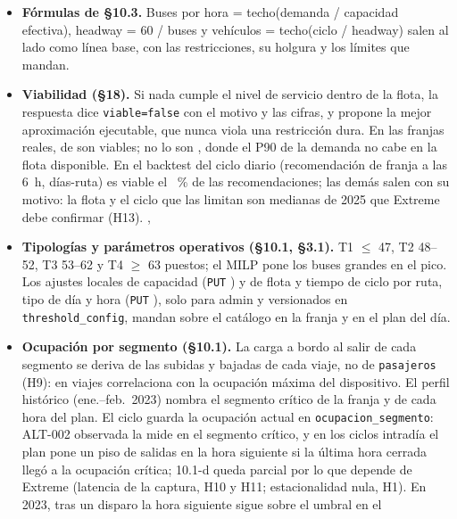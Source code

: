 \documentclass[10pt,a4paper]{article}
\begin{document}
\begin{itemize}
\item \textbf{Fórmulas de §10.3.} Buses por hora = techo(demanda / capacidad efectiva), headway = 60 / buses y
  vehículos = techo(ciclo / headway) salen al lado como línea base, con las restricciones, su holgura y los límites
  que mandan.
\item \textbf{Viabilidad (§18).} Si nada cumple el nivel de servicio dentro de la flota, la respuesta dice
  \texttt{viable=false} con el motivo y las cifras, y propone la mejor aproximación ejecutable, que nunca viola una
  restricción dura. En las franjas reales, \FranjasViables{} de \FranjasTotal{} son viables; no lo son
  \FranjasNoViables, donde el P90 de la demanda no cabe en la flota disponible. En el backtest del ciclo diario
  (recomendación de franja a las 6~h, \DiasRuta{} días-ruta) es viable el \ViablesBacktest~\% de las recomendaciones;
  las demás salen con su motivo: la flota y el ciclo que las limitan son medianas de 2025 que Extreme debe confirmar
  (H13).
  ,
\item \textbf{Tipologías y parámetros operativos (§10.1, §3.1).} T1 $\le$ 47, T2 48--52, T3 53--62 y T4 $\ge$ 63
  puestos; el MILP pone los buses grandes en el pico. Los ajustes locales de capacidad (\texttt{PUT}
  ) y de flota y tiempo de ciclo por ruta, tipo de día y hora (\texttt{PUT}
  ), solo para admin y versionados en \texttt{threshold\_config}, mandan sobre el catálogo en la
  franja y en el plan del día. 
\item \textbf{Ocupación por segmento (§10.1).} La carga a bordo al salir de cada segmento se deriva de las subidas y
  bajadas de cada viaje, no de \texttt{pasajeros} (H9): en \OcupViajesValidacion{} viajes correlaciona
  \OcupCorrelacion{} con la ocupación máxima del dispositivo. El perfil histórico (ene.--feb.~2023) nombra el segmento
  crítico de la franja y de cada hora del plan. El ciclo guarda la ocupación actual en \texttt{ocupacion\_segmento}:
  ALT-002 observada la mide en el segmento crítico, y en los ciclos intradía el plan pone un piso de salidas en la hora
  siguiente si la última hora cerrada llegó a la ocupación crítica; 10.1-d queda parcial por lo que depende de Extreme
  (latencia de la captura, H10 y H11; estacionalidad nula, H1). En 2023, tras un disparo la hora siguiente sigue sobre el umbral en el

\end{itemize}
\end{document}
